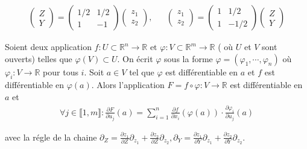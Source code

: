 {\color{lightgray}  
\begin{eqnarray*}
	\left ( \begin{array}{c} Z \\ Y \end{array} \right ) = \left ( \begin{array}{cc} 1/2 &  1/2  \\ 1 & - 1  \end{array} \right ) \left ( \begin{array}{c} z_1 \\ z_2 \end{array} \right ), & & \left ( \begin{array}{c} z_1 \\ z_2 \end{array} \right ) = \left ( \begin{array}{cc} 1 &  1/2  \\ 1 & - 1/2  \end{array} \right ) \left ( \begin{array}{c} Z \\ Y \end{array} \right )
\end{eqnarray*}


\begin{Propr}
	Soient deux application $f \colon U \subset	 \mathbb{R}^n \rightarrow \mathbb{R} \mbox{ et } \varphi \colon V \subset \mathbb{R}^m \rightarrow \mathbb{R}$ ( où $U$ et $V$ sont ouverts) telles que $\varphi(V) \subset U$. On écrit $\varphi$ sous la forme $\varphi = ( \varphi_1 , \cdots , \varphi_n )$ où $\varphi_i \colon V \rightarrow \mathbb{R} $ pour tous $i$. Soit $a \in V $ tel que $\varphi$ est différentiable en $a$ et $f$ est différentiable en $\varphi(a)$. Alors l'application $F = f \circ \varphi \colon V \rightarrow \mathbb{R}$ est différentiable en $a$ et 
	\begin{eqnarray*}
		\forall j \in \llbracket 1 , m \rrbracket \colon \frac{\partial F}{\partial u_j} ( a ) = \sum_{i=1}^n \frac{\partial f}{ \partial x_i} (\varphi (a) ) \cdot \frac{\partial \varphi_i}{ \partial u_j} (a) 
	\end{eqnarray*} 
\end{Propr}

avec la régle de la chaine  $\partial_Z = \frac{\partial z_1}{\partial Z}\partial_{z_1} + \frac{\partial z_2}{\partial Z}\partial_{z_2}, \partial_Y = \frac{\partial z_1}{\partial Y}\partial_{z_1} + \frac{\partial z_2}{\partial Y}\partial_{z_2}$.

}

